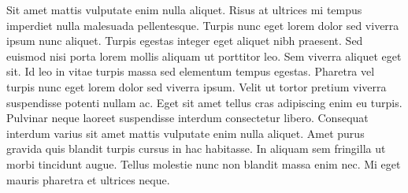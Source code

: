 Sit amet mattis vulputate enim nulla aliquet. Risus at ultrices mi tempus imperdiet nulla malesuada pellentesque. Turpis nunc eget lorem dolor sed viverra ipsum nunc aliquet. Turpis egestas integer eget aliquet nibh praesent. Sed euismod nisi porta lorem mollis aliquam ut porttitor leo. Sem viverra aliquet eget sit. Id leo in vitae turpis massa sed elementum tempus egestas. Pharetra vel turpis nunc eget lorem dolor sed viverra ipsum. Velit ut tortor pretium viverra suspendisse potenti nullam ac. Eget sit amet tellus cras adipiscing enim eu turpis. Pulvinar neque laoreet suspendisse interdum consectetur libero. Consequat interdum varius sit amet mattis vulputate enim nulla aliquet. Amet purus gravida quis blandit turpis cursus in hac habitasse. In aliquam sem fringilla ut morbi tincidunt augue. Tellus molestie nunc non blandit massa enim nec. Mi eget mauris pharetra et ultrices neque.
